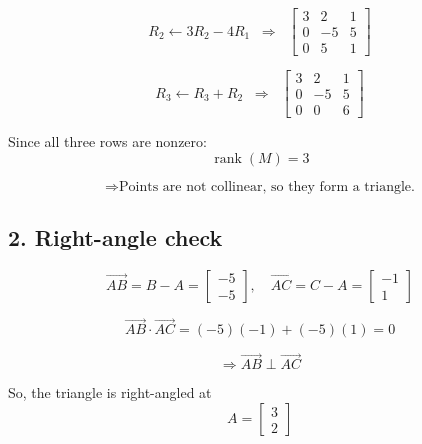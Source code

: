 \documentclass[journal]{IEEEtran}
\begin{document}
\begin{equation}
R_2 \leftarrow 3R_2-4R_1
\;\;\Rightarrow\;\;
\begin{bmatrix}
3 & 2 & 1\\
0 & -5 & 5\\
0 & 5 & 1
\end{bmatrix}
\end{equation}

\begin{equation}
R_3 \leftarrow R_3+R_2
\;\;\Rightarrow\;\;
\begin{bmatrix}
3 & 2 & 1\\
0 & -5 & 5\\
0 & 0 & 6
\end{bmatrix}
\end{equation}

Since all three rows are nonzero:
\begin{equation}
\operatorname{rank}(M)=3
\end{equation}

\[
\Rightarrow \text{Points are not collinear, so they form a triangle.}
\]



\subsection*{2. Right-angle check}

\begin{equation}
\overrightarrow{AB}=B-A=\begin{bmatrix}-5\\-5\end{bmatrix}, \quad 
\overrightarrow{AC}=C-A=\begin{bmatrix}-1\\1\end{bmatrix}
\end{equation}

\begin{equation}
\overrightarrow{AB}\cdot \overrightarrow{AC} = (-5)(-1)+(-5)(1)=0
\end{equation}

\[
\Rightarrow \overrightarrow{AB}\perp \overrightarrow{AC}
\]

So, the triangle is right-angled at
\begin{equation}
A=\begin{bmatrix}3\\2\end{bmatrix}
\end{equation}
\end{document}
